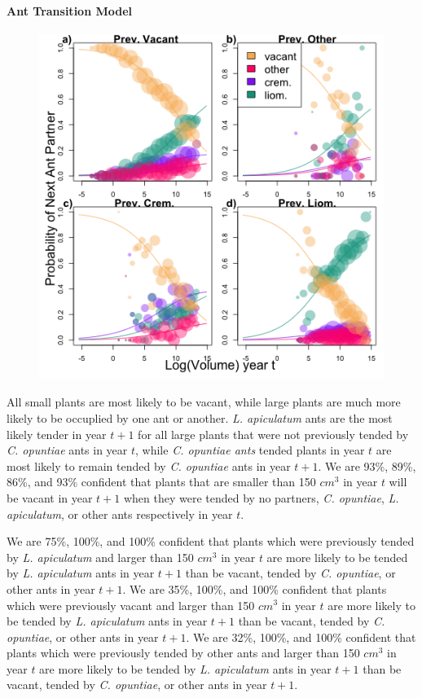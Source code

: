 \documentclass[11pt]{article}
\begin{document}
\paragraph{Ant Transition Model}
\begin{figure}
	\includegraphics[width=0.95\linewidth]{Figures/AntSizeMulti.png}
\end{figure}
All small plants are most likely to be vacant, while large plants are much more likely to be occuplied by one ant or another. 
\textit{L. apiculatum} ants are the most likely tender in year $t+1$ for all large plants that were not previously tended by \textit{C. opuntiae} ants in year $t$, while \textit{C. opuntiae ants} tended plants in year $t$ are most likely to remain tended by \textit{C. opuntiae} ants in year $t+1$.
We are 93\%, 89\%, 86\%, and 93\% confident that plants that are smaller than 150 $cm^3$ in year $t$ will be vacant in year $t+1$ when they were tended by no partners, \textit{C. opuntiae}, \textit{L. apiculatum}, or other ants respectively in year $t$.

We are 75\%, 100\%, and 100\% confident that plants which were previously tended by \textit{L. apiculatum} and larger than 150 $cm^3$ in year $t$ are more likely to be tended by \textit{L. apiculatum} ants in year $t+1$ than be vacant, tended by \textit{C. opuntiae}, or other ants in year $t+1$.
We are 35\%, 100\%, and 100\% confident that plants which were previously vacant and larger than 150 $cm^3$ in year $t$ are more likely to be tended by \textit{L. apiculatum} ants in year $t+1$ than be vacant, tended by \textit{C. opuntiae}, or other ants in year $t+1$.
We are 32\%, 100\%, and 100\% confident that plants which were previously tended by other ants and larger than 150 $cm^3$ in year $t$ are more likely to be tended by \textit{L. apiculatum} ants in year $t+1$ than be vacant, tended by \textit{C. opuntiae}, or other ants in year $t+1$.
\end{document}
